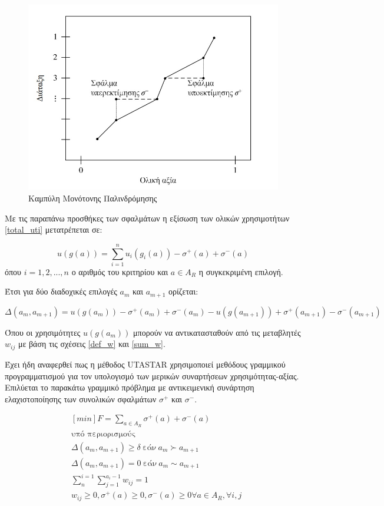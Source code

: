 \documentclass[11pt,a4paper,titlepage]{article}
\numberwithin{equation}{section}
\begin{document}
\begin{figure}[H]
	\centering
	\includegraphics[width=0.7\linewidth]{media/graph_mono.jpg}
	\caption{Καμπύλη Μονότονης Παλινδρόμησης}
	\label{fig:graph_monot}
\end{figure}

Με τις παραπάνω προσθήκες των σφαλμάτων η εξίσωση των ολικών χρησιμοτήτων \ref{total_uti} μετατρέπεται σε:

\begin{equation}\label{total_uti_fin}
	u(g(a)) = \sum_{i=1}^{n} u_{i}(g_{i}(a)) - σ^{+}(a) + σ^{-}(a)
\end{equation}
όπου $i = 1,2,...,n$ ο αριθμός του κριτηρίου και $a\in A_{R}$ η συγκεκριμένη επιλογή.

Έτσι για δύο διαδοχικές επιλογές $a_{m}$ και $a_{m+1}$ ορίζεται:

\begin{equation}\label{def_deltas}
	Δ(a_{m}, a_{m+1}) = u(g(a_{m})) - σ^{+}(a_{m}) + σ^{-}(a_{m}) - u(g(a_{m+1})) + σ^{+}(a_{m+1}) - σ^{-}(a_{m+1})
\end{equation}

Όπου οι χρησιμότητες $u(g(a_{m}))$ μπορούν να αντικατασταθούν από τις μεταβλητές $w_{ij}$ με βάση τις σχέσεις \ref{def_w} και \ref{sum_w}.
 
Έχει ήδη αναφερθεί πως η μέθοδος UTASTAR χρησιμοποιεί μεθόδους γραμμικού προγραμματισμού για τον υπολογισμό των μερικών συναρτήσεων χρησιμότητας-αξίας. Επιλύεται το παρακάτω γραμμικό πρόβλημα με αντικειμενική συνάρτηση ελαχιστοποίησης των συνολικών σφαλμάτων $σ^{+}$ και $σ^{-}$.

\begin{equation}\label{linear_program}
	\begin{aligned}
	&[min] F = \sum_{a\in A_{R}} {σ^{+}(a) + σ^{-}(a)} \\
	&\text{υπό περιορισμούς}\\
	&Δ(a_{m},a_{m+1}) \geq δ ~\text{εάν}~ a_{m}\succ a_{m+1}\\
	&Δ(a_{m},a_{m+1}) = 0 ~\text{εάν}~ a_{m}\sim a_{m+1}\\
	&\sum_{n}^{i=1}\sum_{j=1}^{a_{i}-1} w_{ij} = 1\\
	& w_{ij} \geq 0, σ^{+}(a) \geq 0, σ^{-}(a) \geq 0 \forall a\in A_{R}, \forall i,j
	\end{aligned}
\end{equation}
 
\end{document}

